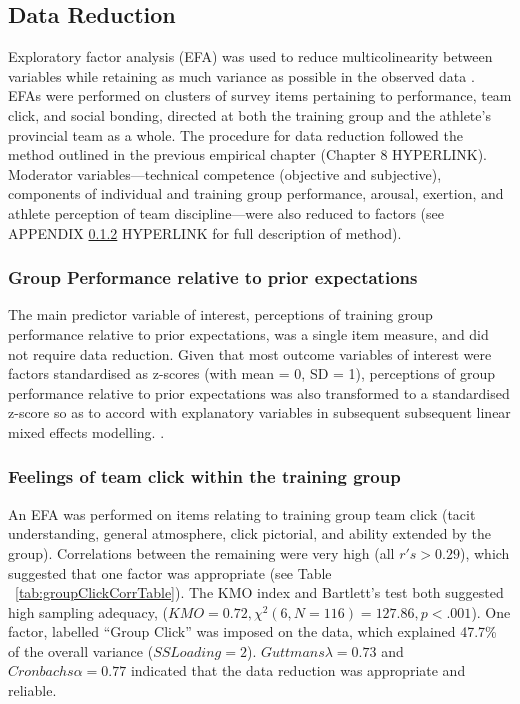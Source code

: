 \subsection{Data Reduction}
Exploratory factor analysis (EFA) was used to reduce multicolinearity between variables while retaining as much variance as possible in the observed data \citep[, see appendix ~\ref{appendix:EFA}]{Yong2013}.
EFAs were performed on clusters of survey items pertaining to performance, team click, and social bonding, directed at both the training group and the athlete's provincial team as a whole.  The procedure for data reduction followed the method outlined in the previous empirical chapter (Chapter 8 HYPERLINK).  Moderator variables---technical competence (objective and subjective), components of individual and training group performance, arousal, exertion, and athlete perception of team discipline---were also reduced to factors (see APPENDIX \ref{} HYPERLINK for full description of method).

\subsubsection{Group Performance relative to prior expectations}
The main predictor variable of interest, perceptions of training group performance relative to prior expectations, was a single item measure, and did not require data reduction.  Given that most outcome variables of interest were factors standardised as z-scores (with mean = 0, SD = 1), perceptions of group performance relative to prior expectations was also transformed to a standardised z-score so as to accord with explanatory variables in subsequent subsequent linear mixed effects modelling. \citep[for an explanation, see][]{}.

\subsubsection{Feelings of team click within the training group}
An EFA was performed on items relating to training group team click (tacit understanding, general atmosphere, click pictorial, and ability extended by the group).  Correlations between the remaining were very high (all $r's > 0.29$), which suggested that one factor was appropriate (see Table ~\ref{tab:groupClickCorrTable}). The KMO index and Bartlett's test both suggested high sampling adequacy, ($KMO =  0.72, \chi^2(6, N = 116) = 127.86, p < .001$). One factor, labelled ``Group Click'' was imposed on the data, which explained 47.7\% of the overall variance ($SS Loading = 2$). $Guttmans \lambda = 0.73$ and $Cronbachs \alpha = 0.77$ indicated that the data reduction was appropriate and reliable.

